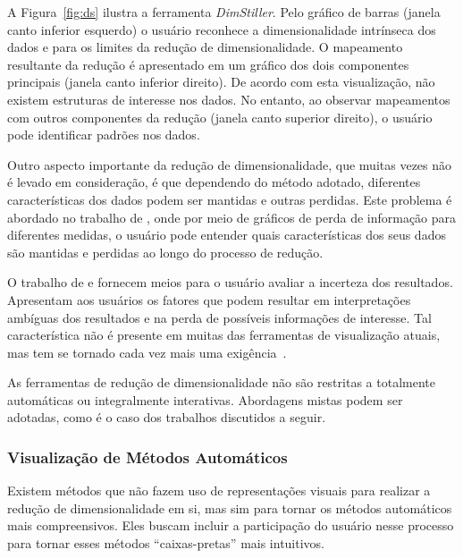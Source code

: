A Figura~\ref{fig:ds} ilustra a ferramenta
\emph{DimStiller}. Pelo gráfico de barras (janela canto
inferior esquerdo) o usuário reconhece a dimensionalidade
intrínseca dos dados e para os limites da redução de
dimensionalidade. O mapeamento resultante da redução é
apresentado em um gráfico dos dois componentes principais
(janela canto inferior direito). De acordo com esta
visualização, não existem estruturas de interesse nos dados.
No entanto, ao observar mapeamentos com outros componentes
da redução (janela canto superior direito), o usuário pode
identificar padrões nos dados.

Outro aspecto importante da redução de dimensionalidade,
que muitas vezes não é levado em consideração, é que
dependendo do método adotado, diferentes características dos
dados podem ser mantidas e outras perdidas. Este problema é
abordado no trabalho de \citet{Johansson2009}, onde por meio
de gráficos de perda de informação para diferentes medidas,
o usuário pode entender quais características dos seus dados
são mantidas e perdidas ao longo do processo de redução. 

O trabalho de \citet{Johansson2009} e \cite{Ingram2010} 
fornecem meios para o usuário avaliar a incerteza dos
resultados. Apresentam aos
usuários os fatores que podem resultar em interpretações
ambíguas dos resultados e na perda de possíveis informações
de interesse. Tal característica não é presente em muitas das
ferramentas de visualização atuais, mas tem se tornado cada
vez mais uma exigência~\cite{Dill2012}.

As ferramentas de redução de dimensionalidade não são
restritas a totalmente automáticas ou integralmente
interativas. Abordagens mistas podem ser adotadas, como é o
caso dos trabalhos discutidos a seguir.

\subsubsection{Visualização de Métodos Automáticos}

Existem métodos que não fazem uso de representações
visuais para realizar a redução de dimensionalidade em si,
mas sim para tornar os métodos automáticos mais
compreensivos. Eles buscam incluir a participação do usuário
nesse processo para tornar esses métodos ``caixas-pretas'' mais
intuitivos. 

